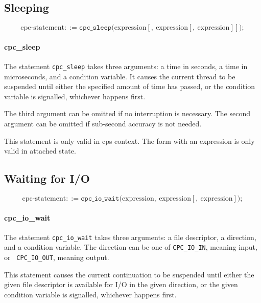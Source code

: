 \documentclass[a4paper]{report}
\begin{document}
\subsection{Sleeping}

\[ \mbox{cpc-statement} ::=
     \mathtt{cpc\_sleep} \mathtt{(} \mbox{expression}
                                   [ \mathtt{,}\ \mbox{expression}
                                     [ \mathtt{,}\
                                         \mbox{expression} ]]
                         \mathtt{)} \mathtt{;} \]

\paragraph{cpc\_sleep} The statement {\tt cpc\_sleep} takes three
arguments: a time in seconds, a time in microseconds, and a condition
variable.  It causes the current thread to be suspended until either the
specified amount of time has passed, or the condition variable is
signalled, whichever happens first.

The third argument can be omitted if no interruption is necessary.
The second argument can be omitted if sub-second accuracy is not
needed.

This statement is only valid in cps context.  The form with an expression
is only valid in attached state.

\subsection{Waiting for I/O}
\[ \mbox{cpc-statement} ::=
   \mathtt{cpc\_io\_wait} \mathtt{(} \mbox{expression}
                                   \mathtt{,}\ \mbox{expression}
                                   [ \mathtt{,}\ \mbox{expression} ]
                         \mathtt{)} \mathtt{;}\]

\paragraph{cpc\_io\_wait} The statement {\tt cpc\_io\_wait} takes three
arguments: a file descriptor, a direction, and a condition variable.
The direction can be one of {\tt CPC\_IO\_IN}, meaning input, or {\tt
  CPC\_IO\_OUT}, meaning output.

This statement causes the current continuation to be suspended until
either the given file descriptor is available for I/O in the given
direction, or the given condition variable is signalled, whichever
happens first.
\end{document}
